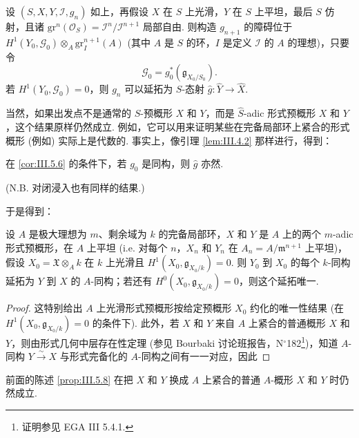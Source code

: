 \begin{corollary}\label{cor:III.5.6}
设 $(S, X, Y, \mathcal{I}, g_n)$ 如上，再假设 $X$ 在 $S$ 上光滑，$Y$ 在 $S$ 上平坦，最后 $S$ 仿射，且诸 $\mathrm{gr}^{n}(\mathcal{O}_S) = \mathcal{I}^n/\mathcal{I}^{n+1}$ 局部自由. 则构造 $g_{n+1}$ 的障碍位于 $H^1(Y_0, \mathcal{G}_0) \otimes_A \mathrm{gr}_{I}^{n+1}(A)$ (其中 $A$ 是 $S$ 的环，$I$ 是定义 $\mathcal{I}$ 的 $A$ 的理想)，只要令
\[
\mathcal{G}_0 = g_0^{*}(\mathfrak{g}_{X_0/S_0}).
\]
若 $H^1(Y_0, \mathcal{G}_0) = 0$，则 $g_n$ 可以延拓为 $S$-态射 $\widehat{g} \colon \widehat{Y} \to \widehat{X}$.
\end{corollary}

当然，如果出发点不是通常的 $S$-预概形 $X$ 和 $Y$，而是 $\widehat{S}$-adic 形式预概形 $X$ 和 $Y$，这个结果原样仍然成立. 例如，它可以用来证明某些在完备局部环上紧合的形式概形 (例如) 实际上是代数的. 事实上，像引理 \ref{lem:III.4.2} 那样进行，得到：

\begin{corollary}\label{cor:III.5.7}
在 \ref{cor:III.5.6} 的条件下，若 $g_0$ 是同构，则 $\widehat{g}$ 亦然.
\end{corollary}

(N.B. 对闭浸入也有同样的结果.)

于是得到：

\begin{proposition}\label{prop:III.5.8}
设 $A$ 是极大理想为 $m$、剩余域为 $k$ 的完备局部环，$X$ 和 $Y$ 是 $A$ 上的两个 $m$-adic 形式预概形，在 $A$ 上平坦 (i.e. 对每个 $n$，$X_n$ 和 $Y_n$ 在 $A_n = A/\mathfrak{m}^{n+1}$ 上平坦)，假设 $X_0 = \mathfrak{X} \otimes_A k$ 在 $k$ 上光滑且 $H^1(X_0, \mathfrak{g}_{X_0/k}) = 0$. 则 $Y_0$ 到 $X_0$ 的每个 $k$-同构延拓为 $Y$ 到 $X$ 的 $A$-同构；若还有 $H^0(X_0, \mathfrak{g}_{X_0/k}) = 0$，则这个延拓唯一.
\end{proposition}

\begin{proof}
这特别给出 $A$ 上光滑形式预概形按给定预概形 $X_0$ 约化的唯一性结果 (在 $H^1(X_0, \mathfrak{g}_{X_0/k}) = 0$ 的条件下). 此外，若 $X$ 和 $Y$ 来自 $A$ 上紧合的普通概形 $X$ 和 $Y$，则由形式几何中层存在性定理 (参见 Bourbaki 讨论班报告，N$^{\circ}$182\footnote{证明参见 EGA III 5.4.1.})，知道 $A$-同构 $Y \xrightarrow{\sim} X$ 与形式完备化的 $A$-同构之间有一一对应，因此
\end{proof}

\begin{corollary}\label{cor:III.5.9}
前面的陈述 \ref{prop:III.5.8} 在把 $X$ 和 $Y$ 换成 $A$ 上紧合的普通 $A$-概形 $X$ 和 $Y$ 时仍然成立.
\end{corollary}

